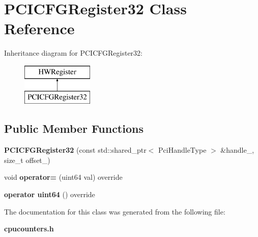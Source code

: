 \section{P\+C\+I\+C\+F\+G\+Register32 Class Reference}
\label{classPCICFGRegister32}
Inheritance diagram for P\+C\+I\+C\+F\+G\+Register32\+:\begin{figure}[H]
\begin{center}
\leavevmode
\includegraphics[height=2.000000cm]{classPCICFGRegister32}
\end{center}
\end{figure}
\subsection*{Public Member Functions}
\begin{DoxyCompactItemize}
\item 
\mbox{\label{classPCICFGRegister32_a82ceb30af0ccb81acf798c85b2e64143}} 
{\bfseries P\+C\+I\+C\+F\+G\+Register32} (const std\+::shared\+\_\+ptr$<$ Pci\+Handle\+Type $>$ \&handle\+\_\+, size\+\_\+t offset\+\_\+)
\item 
\mbox{\label{classPCICFGRegister32_ad406c0b040f0c7f113ea3e44c5f2dd63}} 
void {\bfseries operator=} (uint64 val) override
\item 
\mbox{\label{classPCICFGRegister32_a65ab5452e68c67669a6e666ea0312be5}} 
{\bfseries operator uint64} () override
\end{DoxyCompactItemize}


The documentation for this class was generated from the following file\+:\begin{DoxyCompactItemize}
\item 
\textbf{ cpucounters.\+h}\end{DoxyCompactItemize}
